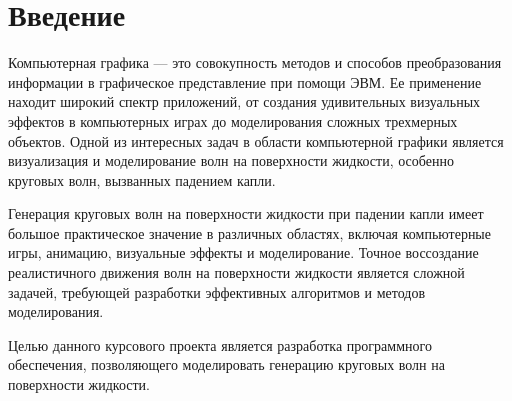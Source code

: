 \chapter*{Введение}

Компьютерная графика --- это совокупность методов и способов 
преобразования информации в графическое представление при помощи ЭВМ. 
Ее применение находит широкий спектр приложений, от создания удивительных визуальных эффектов в 
компьютерных играх до моделирования сложных трехмерных объектов. 
Одной из интересных задач в области компьютерной графики является визуализация и 
моделирование волн на поверхности жидкости, особенно круговых волн, вызванных падением капли.

Генерация круговых волн на поверхности жидкости при падении капли имеет большое практическое
значение в различных областях, включая компьютерные игры, анимацию, визуальные эффекты и моделирование. 
Точное воссоздание реалистичного движения волн на поверхности жидкости является сложной задачей, 
требующей разработки эффективных алгоритмов и методов моделирования.

Целью данного курсового проекта является разработка программного обеспечения, позволяющего моделировать 
генерацию круговых волн на поверхности жидкости.
